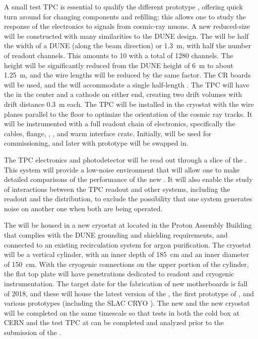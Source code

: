A small test TPC is essential to qualify the different prototype , offering quick turn around for changing components and refilling; this allows one to study the response of the electronics to signals from cosmic-ray muons.  A new reduced-size  will be constructed with many similarities to the DUNE  design.  The  will be half the width of a DUNE  (along the beam direction) or \SI{1.3}{m}, with half the number of readout channels.  This amounts to \num{10}  with a total of \num{1280} channels.  The height will be significantly reduced from the DUNE  height of \SI{6}{m} to about \SI{1.25}{m}, and the wire lengths will be reduced by the same factor.  The  CR boards will be used, and  the  will accommodate a single half-length .  The TPC will have the  in the center and a cathode on either end, creating two drift volumes with drift distance \SI{0.3}{m} each.  The TPC will be installed in the cryostat with the wire planes parallel to the floor to optimize the orientation of the cosmic ray tracks.  It will be instrumented with a full readout chain of  electronics, specifically  the cables, \fdth flange, , , and warm interface crate.  Initially,   will be used for commissioning, and later  with prototype  will be swapped in.

The TPC electronics and photodetector will be read out through a slice of the  .  This system will provide a low-noise environment that will allow one to make detailed comparisons of the performance of the new . It will also enable the study of interactions between the TPC readout and other systems, including the  readout and the  distribution, to exclude the possibility that one system generates noise on another one when both are being operated.
 
The  will be housed in a new \lar cryostat at \fnal located in the Proton Assembly Building that complies with the DUNE grounding and shielding requirements, and connected to an existing recirculation system for argon purification.  The cryostat will be a vertical cylinder, with an inner depth of \SI{185}{cm} and an inner diameter of \SI{150}{cm}.  With the cryogenic connections on the upper portion of the cylinder, the flat top plate will have penetrations dedicated to readout and cryogenic instrumentation.  The target date for the fabrication of new  motherboards is fall of 2018, and these will house the latest version of the  , the first prototype of , and various  prototypes (including the SLAC CRYO ).  The new  and the new cryostat will be completed on the same timescale so that tests in both the  cold box at CERN and the test TPC at \fnal can be completed and analyzed prior to the submission of the .  
